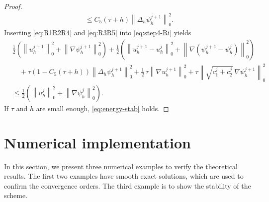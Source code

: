 \begin{proof}
\begin{align}
  \leq
  C_{5}(\tau + h)\left\|\Delta_{h}\psi_{h}^{j+1}\right\|_{0}^{2}.
  \label{eq:R3R5}
\end{align}
Inserting \eqref{eq:R1R2R4} and \eqref{eq:R3R5} into \eqref{eq:step4-Ri} yields
\begin{align}
  &\frac{1}{2}\!\left(
    \left\|u_{h}^{j+1}\right\|_{0}^{2}
    + \left\|\nabla\psi_{h}^{j+1}\right\|_{0}^{2}
  \right)
  + \frac{1}{2}\!\left(
    \left\|u_{h}^{j+1} - u_{h}^{j}\right\|_{0}^{2}
    + \left\|\nabla(\psi_{h}^{j+1} - \psi_{h}^{j})\right\|_{0}^{2}
  \right)
  \nonumber\\
  &\quad
  + \tau\!\left(1 - C_{5}(\tau + h)\right)
    \left\|\Delta_{h}\psi_{h}^{j+1}\right\|_{0}^{2}
  + \frac{1}{2}\,\tau\left\|\nabla u_{h}^{j+1}\right\|_{0}^{2}
  + \tau\left\|\sqrt{c_{1}^{j} + c_{2}^{j}}\,\nabla\psi_{h}^{j+1}\right\|_{0}^{2}
  \nonumber\\
  &\leq
  \frac{1}{2}\!\left(
    \left\|u_{h}^{j}\right\|_{0}^{2}
    + \left\|\nabla\psi_{h}^{j}\right\|_{0}^{2}
  \right).
  \label{eq:energy-ineq}
\end{align}
If $\tau$ and $h$ are small enough, \eqref{eq:energy-stab} holds.
\end{proof}

\section{Numerical implementation}
\label{sec:numerics}

In this section, we present three numerical examples to verify the theoretical results. The
first two examples have smooth exact solutions, which are used to confirm the convergence
orders. The third example is to show the stability of the scheme.

